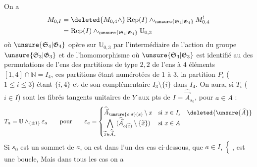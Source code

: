 On a
\[
\begin{aligned}
M_{0,I}&=\deleted{M_{0,4}\wedge}\operatorname{Rep}(I)\wedge_{\unsure{\mathfrak{S}_4|\mathfrak{G}_4}}M^!_{0,4}\\
&=\operatorname{Rep}(I)\wedge_{\unsure{\mathfrak{S}_4|\mathfrak{G}_4}}\mathbb{U}_{0,3}
\end{aligned}
\]
où $\unsure{\mathfrak{S}_4|\mathfrak{G}_4}$ opère sur $\mathbb{U}_{0,3}$ par l'intermédiaire de l'action du groupe $\unsure{\mathfrak{S}_3|\mathfrak{G}_3}$ et de l'homomorphisme
où $\unsure{\mathfrak{S}_3|\mathfrak{G}_3}$ est identifié au   des permutations de l'ens des partitions de type $2,2$ de l'ens à $4$ éléments $[1,4]\cap\mathbb{N}=I_4$, ces partitions étant numérotées de $1$ à $3$, la partition \uline{$P_i$} ($1\leq i\leq3$) étant  $\{i,4\}$ et de son complémentaire  $I_3\setminus\{i\}$ dans $I_4$. On aura, si $T_i$ ($i\in I$) sont les fibrés tangents unitaires de $Y$ aux pts de $I=\widehat{\vec A}_{s_0}$, pour  $a\in A$ :
\[
T_a=\mathbb{U}\wedge_{\{\pm1\}}\varepsilon_a\qquad\text{pour}\qquad
\varepsilon_a=\begin{cases}
\widehat{\vec{A}}_{\unsure{o|\sigma}(x)}\setminus x&\text{si }x\in I_s\quad\deleted{\unsure{\widehat{A}}}\\
\displaystyle\bigwedge_{\widetilde{x}\in\widehat{\vec{A}}_x}(\widehat{\vec{A}}_{o(\widetilde{x})}\setminus\{\widetilde{x}\})&\text{si }x\in A
\end{cases}
\]
 Si $s_0$ est un sommet de $a$, on est dans l'un des  cas ci-dessous,  que $a\in I$,  $\Bigl\{$  , est une boucle,   Mais dans tous les cas on a

